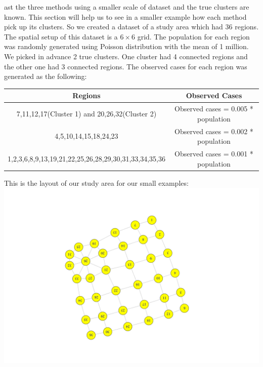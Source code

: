 \documentclass[12pt]{article}
\begin{document}
\begin{enumerate}
ast the three methods using a smaller scale of dataset and the true clusters are known. This section will help us to see in a smaller example how each method pick up its clusters. So we created a dataset of a study area which had 36 regions. The spatial setup of this dataset is a $6\times6$ grid. The population for each region was randomly generated using Poisson distribution with the mean of 1 million. We picked in advance 2 true clusters. One cluster had 4 connected regions and the other one had 3 connected regions. The observed cases for each region was generated as the following: \\
		
	\begin{tabular}{|c|c|}
	\hline
	Regions & Observed Cases \\
	\hline
	7,11,12,17(Cluster 1) and 20,26,32(Cluster 2) & Observed cases = 0.005 * population \\ 
	4,5,10,14,15,18,24,23 & Observed cases = 0.002 * population \\
	1,2,3,6,8,9,13,19,21,22,25,26,28,29,30,31,33,34,35,36 & Observed cases = 0.001 * population \\
	\hline
	\end{tabular}	
	
	\end{enumerate} 
	
	This is the layout of our study area for our small examples:\\
		\includegraphics[scale=0.3]{Area_layout} \\
	
\end{document}
